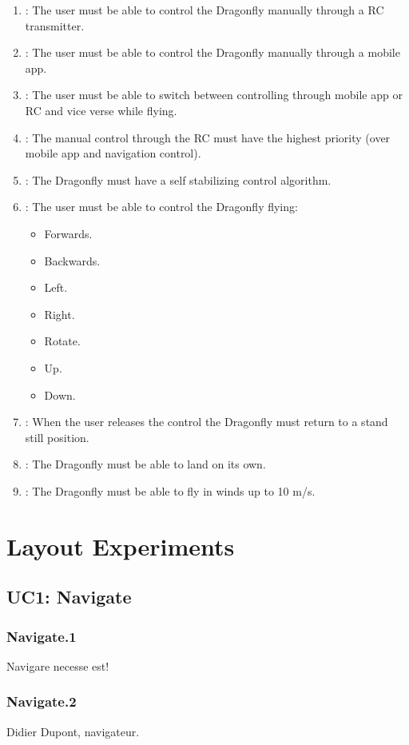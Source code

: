 \documentclass[a4paper]{article}
\makeatletter
\newcommand{\labitem}[2]{%
\def\@itemlabel{\textbf{#2}}
\item
\def\@currentlabel{#2}\label{#1}}
\makeatother
\begin{document}
\begin{enumerate}
\labitem{req:cf.1}{Control Flight.1}: The user must be able to control the Dragonfly manually through a RC transmitter.
\labitem{req:cf.2}{Control Flight.2}: The user must be able to control the Dragonfly manually through a mobile app.
\labitem{req:cf.3}{Control Flight.3}: The user must be able to switch between controlling through mobile app or RC and vice verse while flying.
\labitem{req:cf.4}{Control Flight.4}: The manual control through the RC must have the highest priority (over mobile app and navigation control).
\labitem{req:cf.5}{Control Flight.5}: The Dragonfly must have a self stabilizing control algorithm.
\labitem{req:cf.6}{Control Flight.6}: The user must be able to control the Dragonfly flying:
\begin{itemize}
\item Forwards.
\item Backwards.
\item Left.
\item Right.
\item Rotate.
\item Up.
\item Down.
\end{itemize}
\labitem{req:cf.7}{Control Flight.7}: When the user releases the control the Dragonfly must return to a stand still position.
\labitem{req:cf.8}{Control Flight.8}: The Dragonfly must be able to land on its own.
\labitem{req:cf.9}{Control Flight.9}: The Dragonfly must be able to fly in winds up to 10 m/s.
\end{enumerate}


\section{Layout Experiments}
\subsection*{UC1: Navigate}
\label{uc:nav}
\subsubsection*{Navigate.1}
\label{req:nav.1}
Navigare necesse est!

\subsubsection*{Navigate.2}
\label{req:nav.2}
Didier Dupont, navigateur.
\end{document}
